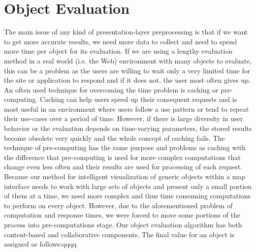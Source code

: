 \documentclass{llncs}
\begin{document}
\section{Object Evaluation}

The main issue of any kind of presentation-layer preprocessing is that if we want to get more accurate results, we need more data to collect and need to spend more time per object for its evaluation. If we are using a lengthy evaluation method in a real world (i.e. the Web) environment with many objects to evaluate, this can be a problem as the users are willing to wait only a very limited time for the site or application to respond and if it does not, the user most often gives up.
An often used technique for overcoming the time problem is caching or pre-computing. Caching can help users speed up their consequent requests and is most useful in an environment where users follow a use pattern or tend to repeat their use-cases over a period of time. However, if there is large diversity in user behavior or the evaluation depends on time-varying parameters, the stored results become obsolete very quickly and the whole concept of caching fails. The technique of pre-computing has the same purpose and problems as caching with the difference that pre-computing is used for more complex computations that change even less often and their results are used for processing of each request.
Because our method for intelligent visualization of generic objects within a map interface needs to work with large sets of objects and present only a small portion of them at a time, we need more complex and thus time consuming computations to perform on every object. However, due to the aforementioned problem of computation and response times, we were forced to move some portions of the process into pre-computations stage.
Our object evaluation algorithm has both content-based and collaborative components. The final value for an object is assigned as follows:qqqq
%
\end{document}
